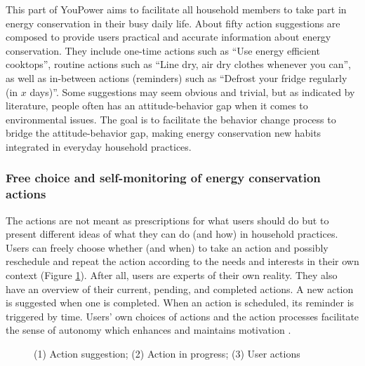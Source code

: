 This part of YouPower aims to %
facilitate all household members to take part in energy conservation in their busy daily life. 
% 
About fifty action suggestions are composed to provide users practical and accurate information about energy conservation. 
They include one-time actions such as ``Use energy efficient cooktops'', routine actions such as ``Line dry, air dry clothes whenever you can'', as well as in-between actions (reminders) such as ``Defrost your fridge regularly (in $x$ days)''. 
Some suggestions may seem obvious and trivial, but as indicated by literature, people often has an attitude-behavior gap when it comes to environmental issues. The goal is to facilitate the behavior change process to bridge the attitude-behavior gap, making energy conservation new habits integrated in everyday household practices. 

\subsubsection{Free choice and self-monitoring of energy conservation actions}
The actions are not meant as prescriptions for what users should do but to present different ideas of what they can do (and how) in household practices. 
Users can freely choose whether (and when) to take an action and possibly reschedule and repeat the action according to the needs and interests in their own context (Figure \ref{fig:actions}). After all, users are experts of their own reality. They also have an overview of their current, pending, and completed actions.
A new action is suggested when one is completed. %
When an action is scheduled, its reminder is triggered by time. Users' own choices of actions and the action processes facilitate the sense of autonomy which enhances and maintains motivation \cite{Ryan2000}. 

\begin{figure}[b!]
      \begin{center}
        \begin{minipage}[t!]{0.33\linewidth}
        \end{minipage}
        \begin{minipage}[t!]{0.31\linewidth}
                \end{minipage}
        \begin{minipage}[t!]{0.33\linewidth}    
        \end{minipage}
      \end{center}
      \caption{(1) Action suggestion; (2) Action in progress; (3) User actions}\label{fig:actions}
\end{figure}


